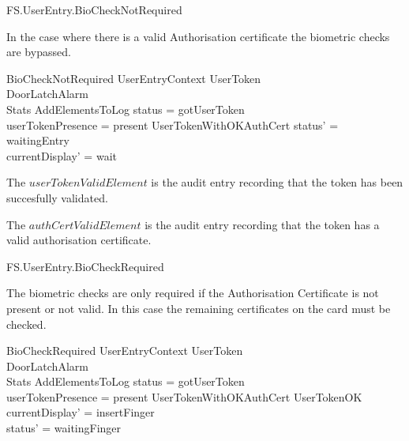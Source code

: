 \begin{traceunit}{FS.UserEntry.BioCheckNotRequired}
\end{traceunit}

In the case where there is a
valid Authorisation certificate the biometric checks are bypassed.

\begin{schema}{BioCheckNotRequired}
        UserEntryContext
\also
        \Xi UserToken
\\      \Xi DoorLatchAlarm        
\\      \Xi Stats
\also
        AddElementsToLog
\where
        status = gotUserToken
\\      userTokenPresence = present
\also
        UserTokenWithOKAuthCert
\also
        status' = waitingEntry
\\      currentDisplay' = wait
\end{schema}
\begin{Zcomment}
\item
The $userTokenValidElement$ is the audit entry recording that the
token has been succesfully validated.
\item 
The $authCertValidElement$ is the audit entry recording that the
token has a valid authorisation certificate.
\end{Zcomment}


\begin{traceunit}{FS.UserEntry.BioCheckRequired}
\end{traceunit}


The biometric checks are only required if the Authorisation
Certificate is not present or not valid. In this case the remaining
certificates on the card must be checked.



\begin{schema}{BioCheckRequired}
        UserEntryContext
\also
        \Xi UserToken
\\      \Xi DoorLatchAlarm        
\\      \Xi Stats
\also
        AddElementsToLog
\where
        status = gotUserToken
\\      userTokenPresence = present
\also
        \lnot UserTokenWithOKAuthCert \land UserTokenOK
\also
	currentDisplay' = insertFinger
\\	status' = waitingFinger
\end{schema}


